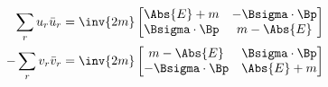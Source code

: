 \begin{align}\label{eqn:desaiDiracAdjoint:680b}
\sum_r u_r \bar{u}_r 
&=
\inv{2m}
\begin{bmatrix}
\Abs{E} + m & -\Bsigma \cdot \Bp \\
\Bsigma \cdot \Bp &
m - \Abs{E}
\end{bmatrix} \\
-\sum_r v_r \bar{v}_r 
&=
\inv{2m}
\begin{bmatrix}
m - \Abs{E} & \Bsigma \cdot \Bp \\
-\Bsigma \cdot \Bp  & \Abs{E} + m 
\end{bmatrix}
\end{align}

\EndArticle
